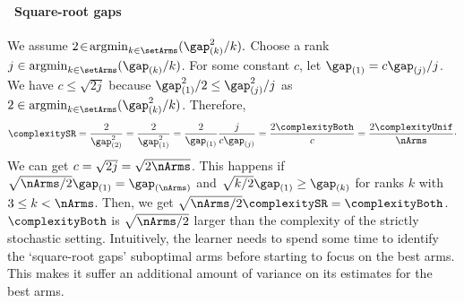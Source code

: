 \paragraph{\raisebox{.04cm}{\textcolor{bull}{$\blacktriangleright$}}~Square-root gaps}   We assume $2\!\in\!\argmin_{k\in\setArms} (\gap^2_{(k)}/k).$ 
\newline
Choose a rank $j\in\argmin_{k\in\setArms} (\gap_{(k)}/k)$. 
For some constant $c$, let $\gap_{(1)}=c\gap_{(j)}/j$. We have 
$c\leq \sqrt{2j}$ because  $\gap^2_{(1)}/2 \leq \gap^2_{(j)}/j$ 
as  $2\in\argmin_{k\in\setArms} (\gap^2_{(k)}/k)$.
Therefore,  \[\complexitySR=\frac{2}{\gap^2_{(2)}}=\frac{2}{\gap^2_{(1)}}= \frac{2}{\gap_{(1)}} \frac{j}{c\gap_{(j)}}=\frac{2\complexityBoth}{c}=\frac{2\complexityUnif}{\nArms}\cdot\]	
We can get $c=\sqrt{2j}=\sqrt{2\nArms}$.
This happens if 
$\sqrt{\nArms/2}\gap_{(1)}=\gap_{(\nArms)}$ and
$\sqrt{k/2}\gap_{(1)}\geq\gap_{(k)}$ for ranks $k$ with $3\leq k<\nArms$. 
Then,  we get  $\sqrt{\nArms/2}\complexitySR=\complexityBoth$.
$\complexityBoth$ is $\sqrt{\nArms/2}$ larger than the complexity of
the strictly stochastic setting.
Intuitively,  the learner needs to spend some time to 
identify the `square-root gaps' suboptimal arms before starting 
to focus on the best arms. This makes it suffer an additional amount
of variance on its estimates for the best arms.
%
%
%  

